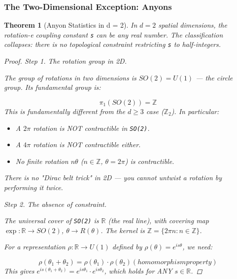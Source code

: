 \documentclass[aps,prd,preprint,superscriptaddress,longbibliography,floatfix]{revtex4-2}
\newtheorem{theorem}{Theorem}[section]
\theoremstyle{remark}
\begin{document}
\subsubsection{The Two-Dimensional Exception: Anyons}

\begin{theorem}[Anyon Statistics in d = 2]
\label{thm:B13} \textit{In $d = 2$ spatial dimensions, the rotation-e coupling constant \texttt{s} can be any real number. The classification collapses: there is no topological constraint restricting \texttt{s} to half-integers.}

\begin{proof}

\textit{Step 1. The rotation group in 2D.}

The group of rotations in two dimensions is $SO(2) = U(1)$ --- the circle group. Its fundamental group is:


\begin{equation}
    \pi_{1}(SO(2)) = \mathbb{Z}
\end{equation}
This is fundamentally different from the $d \geq 3$ case ($\mathbb{Z}_{2}$). In particular:


\begin{itemize}
  \item A $2\pi$ rotation is NOT contractible in \texttt{SO(2)}.
  \item A $4\pi$ rotation is NOT contractible either.
  \item No finite rotation $n\theta$ ($n \in \mathbb{Z}$, $\theta = 2\pi$) is contractible.
\end{itemize}

There is no "Dirac belt trick" in 2D --- you cannot untwist a rotation by performing it twice.

\textit{Step 2. The absence of constraint.}

The universal cover of \texttt{SO(2)} is \texttt{$\mathbb{R}$} (the real line), with covering map $\exp : \mathbb{R} \to SO(2)$, $\theta \to R(\theta)$. The kernel is $\mathbb{Z} = \{2\pi n : n \in \mathbb{Z}\}$.

For a representation $\rho : \mathbb{R} \to U(1)$ defined by $\rho(\theta) = e^{is\theta}$, we need:


\begin{equation}
    \rho(\theta_{1} + \theta_{2}) = \rho(\theta_{1}) \cdot \rho(\theta_{2})    (homomorphism property)
\end{equation}
This gives $e^{is(\theta_{1} + \theta_{2})} = e^{is\theta_{1}} \cdot e^{is\theta_{2}}$, which holds for ANY $s \in \mathbb{R}$.


\end{proof}
\end{theorem}
\end{document}
